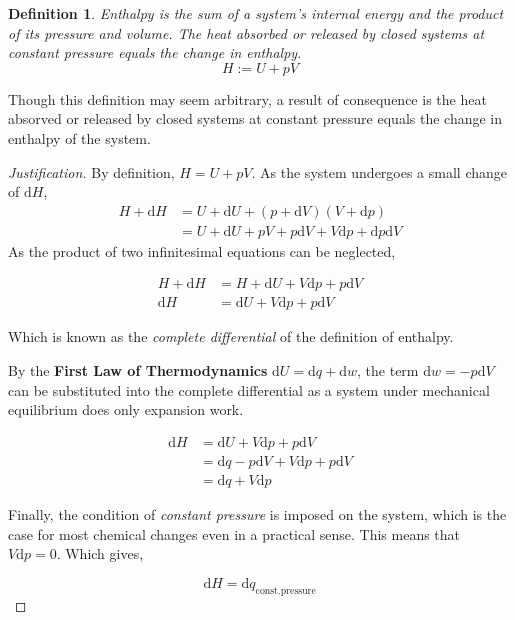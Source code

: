 \documentclass{article}
\numberwithin{theorem}{section}
\numberwithin{corollary}{section}
\numberwithin{postulate}{section}
\numberwithin{lemma}{section}
\newtheorem{definition}{Definition}
\numberwithin{definition}{section}
\newenvironment{justification} {\begin{proof}[Justification]} {\end{proof}}
\begin{document}
\begin{definition}
  Enthalpy is the sum of a system's internal energy and the product of its pressure and
  volume. The heat absorbed or released by closed systems at constant pressure
  equals the change in enthalpy.
  \begin{equation}
   H := U + pV
  \end{equation}
\end{definition}

Though this definition may seem arbitrary, a result of consequence is the heat
absorved or released by closed systems at constant pressure equals the change in
enthalpy of the system.

\begin{justification}
  By definition, $H = U + pV$. As the system undergoes a small change of $\mathrm{d}H$,
  \begin{equation*}
    \begin{split}
      H + \mathrm{d}H & = U + \mathrm{d}U + (p + \mathrm{d}V)(V + \mathrm{d}p) \\
      & = U + \mathrm{d}U + pV + p\mathrm{d}V + V\mathrm{d}p +
      \mathrm{d}p\mathrm{d}V
    \end{split}
  \end{equation*}
  As the product of two infinitesimal equations can be neglected,

  \begin{equation*}
    \begin{split}
      H + \mathrm{d}H & = H + \mathrm{d}U + V\mathrm{d}p + p\mathrm{d}V \\
      \mathrm{d}H & = \mathrm{d}U + V\mathrm{d}p + p\mathrm{d}V
    \end{split}
  \end{equation*}
  
  Which is known as the \textit{complete differential} of the definition of
  enthalpy.

  By the \textbf{First Law of Thermodynamics} $\mathrm{d}U = \mathrm{d}q +
  \mathrm{d}w$, the term $\mathrm{d}w = -p\mathrm{d}V$ can be substituted into
  the complete differential as a system under mechanical equilibrium does only
  expansion work.
  
  \begin{equation*}
    \begin{split}
      \mathrm{d}H & = \mathrm{d}U + V\mathrm{d}p + p\mathrm{d}V \\
      & = \mathrm{d}q - p\mathrm{d}V + V\mathrm{d}p + p\mathrm{d}V \\
      & = \mathrm{d}q + V\mathrm{d}p
    \end{split}
  \end{equation*}

Finally, the condition of \textit{constant pressure} is imposed on the system, which is the case for most chemical changes even in a practical sense. This means that $V\mathrm{d}p = 0$. Which gives,

\begin{equation}
  \mathrm{d}H = \mathrm{d}q_{\mathrm{const. pressure}}
\end{equation}

\end{justification}
\end{document}
